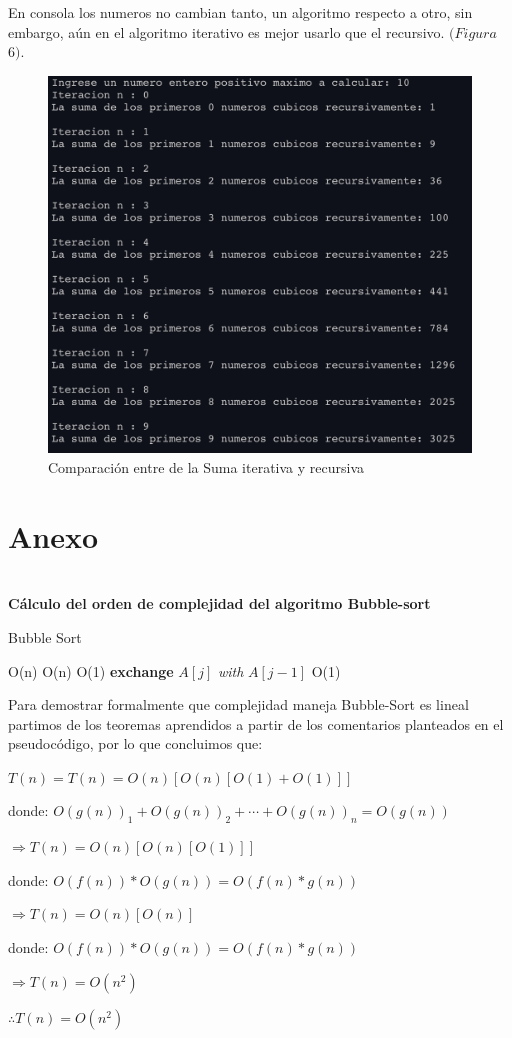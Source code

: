 \documentclass[12pt,twoside]{article}
\begin{document}
En consola los numeros no cambian tanto, un algoritmo respecto a otro, sin embargo, a\'un en el algoritmo iterativo es mejor usarlo
que el recursivo. $(Figura$ $6)$.

\begin{figure}
  \centering
    \includegraphics[height=0.5\textwidth]{Figure6}
  \caption{Comparaci\'on entre de la Suma iterativa y recursiva}
  \label{fig:ejemplo4}
\end{figure}
\newpage

\section{Anexo} 
\text{}\\ 
\textbf{Cálculo del orden de complejidad del algoritmo Bubble-sort}\\ \begin{algorithm}

\caption{Bubble Sort}\label{euclid}
  \begin{algorithmic}[1]
     \Comment O(n)
       \Comment O(n)
          \Comment O(1)
          \State \textbf{exchange} $A[j]$ \textit{with} $A[j - 1]$ \Comment O(1)
        \EndIf
      \EndFor
    \EndFor
  \EndFunction
  \end{algorithmic}
\end{algorithm}


Para demostrar formalmente que complejidad maneja Bubble-Sort  es lineal partimos de los teoremas aprendidos
a partir de los comentarios planteados en el pseudoc\'odigo, por lo que concluimos que:

\centerline{$T(n) = T(n) = O(n)[O(n)[O(1) + O(1)]]$}
\centerline{}
\centerline{donde: $O(g(n))_{1} + O(g(n))_{2}+\cdots+O(g(n))_n = O(g(n))$}
\centerline{}
\centerline{$\Rightarrow T(n) = O(n)[O(n)[O(1)]]$}
\centerline{}
\centerline{donde: $O(f(n)) * O(g(n))= O(f(n)*g(n))$}
\centerline{}
\centerline{$\Rightarrow T(n) = O(n)[O(n)]$}
\centerline{}
\centerline{donde: $O(f(n)) * O(g(n))= O(f(n)*g(n))$}
\centerline{}
\centerline{$\Rightarrow T(n) = O(n^2)$}
\centerline{}
\centerline{$\therefore T(n) = O(n^2)$}
\end{document}
